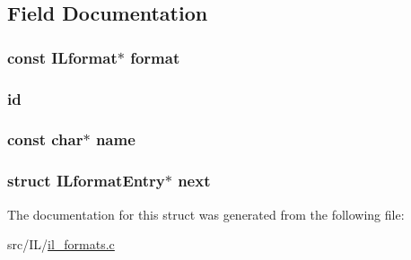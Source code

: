 \subsection{Field Documentation}
\hypertarget{struct_i_lformat_entry_a60111efb8516f5ad535081b7b1dc1409}{
\subsubsection[{format}]{\setlength{\rightskip}{0pt plus 5cm}const {\bf I\-Lformat}$\ast$ format}}\label{struct_i_lformat_entry_a60111efb8516f5ad535081b7b1dc1409}
\hypertarget{struct_i_lformat_entry_a170412aef00e5f928cc83bce78fc85c9}{
\subsubsection[{id}]{ id}}\label{struct_i_lformat_entry_a170412aef00e5f928cc83bce78fc85c9}
\hypertarget{struct_i_lformat_entry_a8f8f80d37794cde9472343e4487ba3eb}{
\subsubsection[{name}]{\setlength{\rightskip}{0pt plus 5cm}const char$\ast$ name}}\label{struct_i_lformat_entry_a8f8f80d37794cde9472343e4487ba3eb}
\hypertarget{struct_i_lformat_entry_a755875449c3d959248a5519afdc0d053}{
\subsubsection[{next}]{\setlength{\rightskip}{0pt plus 5cm}struct {\bf I\-Lformat\-Entry}$\ast$ next}}\label{struct_i_lformat_entry_a755875449c3d959248a5519afdc0d053}


The documentation for this struct was generated from the following file\-:\begin{DoxyCompactItemize}
\item 
src/\-I\-L/\hyperlink{il__formats_8c}{il\-\_\-formats.\-c}\end{DoxyCompactItemize}
